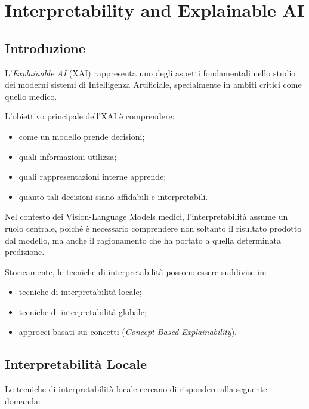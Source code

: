 %
%
\chapter{Interpretability and Explainable AI}

\section{Introduzione}

L'\textit{Explainable AI} (XAI) rappresenta uno degli aspetti fondamentali nello studio dei moderni sistemi di Intelligenza Artificiale, specialmente in ambiti critici come quello medico.

L'obiettivo principale dell'XAI è comprendere:

\begin{itemize}
    \item come un modello prende decisioni;
    \item quali informazioni utilizza;
    \item quali rappresentazioni interne apprende;
    \item quanto tali decisioni siano affidabili e interpretabili.
\end{itemize}

Nel contesto dei Vision-Language Models medici, l'interpretabilità assume un ruolo centrale, poiché è necessario comprendere non soltanto il risultato prodotto dal modello, ma anche il ragionamento che ha portato a quella determinata predizione.

Storicamente, le tecniche di interpretabilità possono essere suddivise in:

\begin{itemize}
    \item tecniche di interpretabilità locale;
    \item tecniche di interpretabilità globale;
    \item approcci basati sui concetti (\textit{Concept-Based Explainability}).
\end{itemize}

\section{Interpretabilità Locale}

Le tecniche di interpretabilità locale cercano di rispondere alla seguente domanda:

